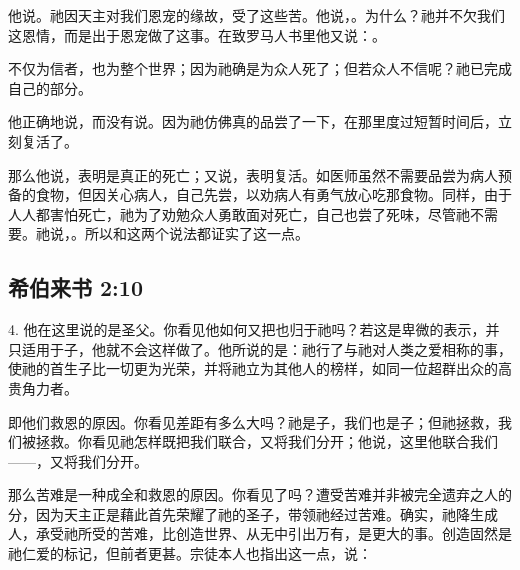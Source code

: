 他说。祂因天主对我们恩宠的缘故，受了这些苦。他说，。为什么？祂并不欠我们这恩情，而是出于恩宠做了这事。在致罗马人书里他又说：。\par

不仅为信者，也为整个世界；因为祂确是为众人死了；但若众人不信呢？祂已完成自己的部分。\par

他正确地说，而没有说。因为祂仿佛真的品尝了一下，在那里度过短暂时间后，立刻复活了。\par

那么他说，表明是真正的死亡；又说，表明复活。如医师虽然不需要品尝为病人预备的食物，但因关心病人，自己先尝，以劝病人有勇气放心吃那食物。同样，由于人人都害怕死亡，祂为了劝勉众人勇敢面对死亡，自己也尝了死味，尽管祂不需要。祂说，。所以和这两个说法都证实了这一点。\par


\subsection{希伯来书 2:10}

4. 他在这里说的是圣父。你看见他如何又把也归于祂吗？若这是卑微的表示，并只适用于子，他就不会这样做了。他所说的是：祂行了与祂对人类之爱相称的事，使祂的首生子比一切更为光荣，并将祂立为其他人的榜样，如同一位超群出众的高贵角力者。\par

即他们救恩的原因。你看见差距有多么大吗？祂是子，我们也是子；但祂拯救，我们被拯救。你看见祂怎样既把我们联合，又将我们分开；他说，这里他联合我们——，又将我们分开。\par

那么苦难是一种成全和救恩的原因。你看见了吗？遭受苦难并非被完全遗弃之人的分，因为天主正是藉此首先荣耀了祂的圣子，带领祂经过苦难。确实，祂降生成人，承受祂所受的苦难，比创造世界、从无中引出万有，是更大的事。创造固然是祂仁爱的标记，但前者更甚。宗徒本人也指出这一点，说： \par


